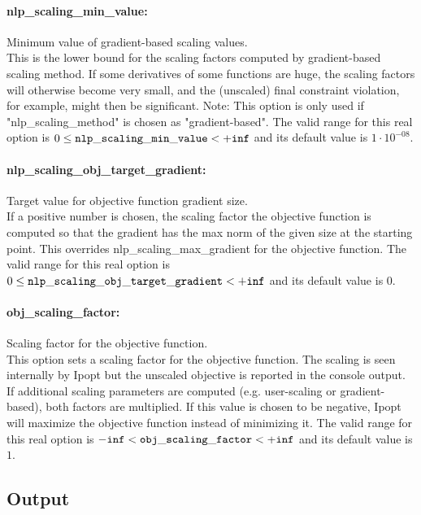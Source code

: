 \paragraph{nlp\_scaling\_min\_value:}\label{sec:nlp_scaling_min_value} Minimum value of gradient-based scaling values. $\;$ \\
 This is the lower bound for the scaling factors
computed by gradient-based scaling method.  If
some derivatives of some functions are huge, the
scaling factors will otherwise become very small,
and the (unscaled) final constraint violation,
for example, might then be significant.  Note:
This option is only used if
"nlp\_scaling\_method" is chosen as
"gradient-based". The valid range for this real option is 
$0 \le {\tt nlp\_scaling\_min\_value } <  {\tt +inf}$
and its default value is $1 \cdot 10^{-08}$.


\paragraph{nlp\_scaling\_obj\_target\_gradient:}\label{sec:nlp_scaling_obj_target_gradient} Target value for objective function gradient size. $\;$ \\
 If a positive number is chosen, the scaling
factor the objective function is computed so that
the gradient has the max norm of the given size
at the starting point.  This overrides
nlp\_scaling\_max\_gradient for the objective
function. The valid range for this real option is 
$0 \le {\tt nlp\_scaling\_obj\_target\_gradient } <  {\tt +inf}$
and its default value is $0$.


\paragraph{obj\_scaling\_factor:}\label{sec:obj_scaling_factor} Scaling factor for the objective function. $\;$ \\
 This option sets a scaling factor for the
objective function. The scaling is seen
internally by Ipopt but the unscaled objective is
reported in the console output. If additional
scaling parameters are computed (e.g.
user-scaling or gradient-based), both factors are
multiplied. If this value is chosen to be
negative, Ipopt will maximize the objective
function instead of minimizing it. The valid range for this real option is 
${\tt -inf} <  {\tt obj\_scaling\_factor } <  {\tt +inf}$
and its default value is $1$.


\subsection{Output}
\label{sec:Output}
